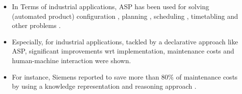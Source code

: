 \documentclass{easychair}
\newcommand{\ASP}{ASP}
\begin{document}
\begin{itemize}
  \item%
  In Terms of industrial applications, \ASP{} has been used for solving (automated product) configuration \cite{soinie99a, hebasasc22a}, planning \cite{jizhkhst19a, sopobasc23a}, scheduling \cite{aldoma17a}, timetabling \cite{bainkaokscsotawa18a} and other problems \cite{fafrsctate18a}. 
  \item%
  Especially, for industrial applications, tackled by a declarative approach like \ASP{}, significant improvements wrt implementation, maintenance costs and human-machine interaction were shown. 
  \item%
  For instance, Siemens reported to save more than 80\% of maintenance costs by using a knowledge representation and reasoning approach \cite{fafrhascsc16a}. 
\end{itemize}%
\end{document}
